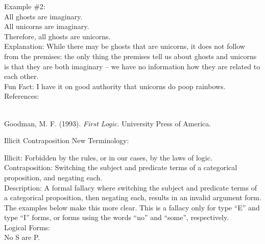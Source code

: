\documentclass[a4paper,12pt,single,pdftex]{scrbook}
\begin{document}
    
      Example \#2:
    \\

    
      All ghosts are imaginary.
    \\

    
      All unicorns are imaginary.
    \\

    
      Therefore, all ghosts are unicorns.
    \\

    
      Explanation: While there may be ghosts that are unicorns, it does not follow from the premises: the only thing the premises tell us about ghosts and unicorns is that they are both imaginary -- we have no information how they are related to each other.
    \\

    
      Fun Fact: I have it on good authority that unicorns do poop rainbows.
    \\

    References:

    
      
        
      \\

      
        
          Goodman, M. F. (1993). {\it First Logic}. University Press of America.
        
      
    
  

Illicit Contraposition
    New Terminology:

    
      Illicit: Forbidden by the rules, or in our cases, by the laws of logic.
    \\

    
      Contraposition: Switching the subject and predicate terms of a categorical proposition, and negating each.
    \\

    
      Description: A formal fallacy where switching the subject and predicate terms of a categorical proposition, then negating each, results in an invalid argument form.  The examples below make this more clear.  This is a fallacy only for type “E” and type “I” forms, or forms using the words “no” and “some”, respectively.
    \\

    
      Logical Forms:
    \\

    
      No S are P.
    \\
\end{document}
